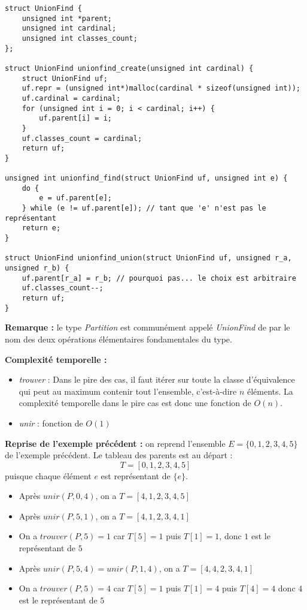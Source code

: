 \documentclass[../../../main.tex]{subfiles}
\begin{document}
\begin{center}
	
\end{center}

\begin{verbatim}
struct UnionFind {
	unsigned int *parent;
	unsigned int cardinal;
	unsigned int classes_count;
};

struct UnionFind unionfind_create(unsigned int cardinal) {
	struct UnionFind uf;
	uf.repr = (unsigned int*)malloc(cardinal * sizeof(unsigned int));
	uf.cardinal = cardinal;
	for (unsigned int i = 0; i < cardinal; i++) {
		uf.parent[i] = i;
	}
	uf.classes_count = cardinal;
	return uf;
}

unsigned int unionfind_find(struct UnionFind uf, unsigned int e) {
	do {
		e = uf.parent[e];
	} while (e != uf.parent[e]); // tant que 'e' n'est pas le représentant
	return e;
}

struct UnionFind unionfind_union(struct UnionFind uf, unsigned r_a, unsigned r_b) {
	uf.parent[r_a] = r_b; // pourquoi pas... le choix est arbitraire
	uf.classes_count--;
	return uf;
}
\end{verbatim}
\textbf{Remarque :} le type \textit{Partition} est communément appelé \textit{UnionFind} de par le nom des deux opérations élémentaires fondamentales du type.

\textbf{Complexité temporelle :}
\begin{itemize}
	\item \textit{trouver} : Dans le pire des cas, il faut itérer sur toute la classe d'équivalence qui peut au maximum contenir tout l'ensemble, c'est-à-dire $n$ éléments. La complexité temporelle dans le pire cas est donc une fonction de $O(n)$.
	\item \textit{unir} : fonction de $O(1)$
\end{itemize}

\textbf{Reprise de l'exemple précédent :} on reprend l'ensemble $E = \{0, 1, 2, 3, 4, 5\}$ de l'exemple précédent. Le tableau des parents est au départ :
$$T = [0, 1, 2, 3, 4, 5]$$
puisque chaque élément $e$ est représentant de $\{e\}$.
\begin{itemize}
	\item Après $unir(P, 0, 4)$, on a $T = [4, 1, 2, 3, 4, 5]$
	\item Après $unir(P, 5, 1)$, on a $T = [4, 1, 2, 3, 4, 1]$
	\item On a $trouver(P, 5) = 1$ car $T[5] = 1$ puis $T[1] = 1$, donc $1$ est le représentant de $5$
	\item Après $unir(P, 5, 4) = unir(P, 1, 4)$, on a $T = [4, 4, 2, 3, 4, 1]$
	\item On a $trouver(P, 5) = 4$ car $T[5] = 1$ puis $T[1] = 4$ puis $T[4] = 4$ donc $4$ est le représentant de $5$
\end{itemize}
\end{document}
